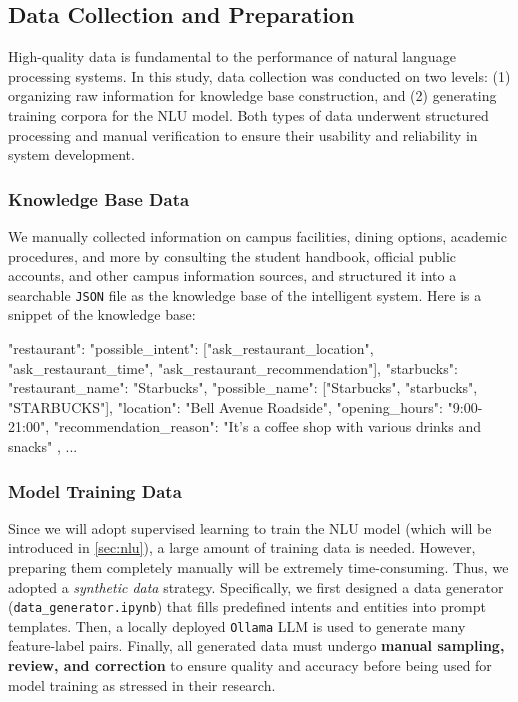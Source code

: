 \documentclass{xum_review}
\begin{document}
	\subsection{Data Collection and Preparation}

	High-quality data is fundamental to the performance of natural language
	processing systems. In this study, data collection was conducted on two
	levels: (1) organizing raw information for knowledge base construction, and
	(2) generating training corpora for the NLU model. Both types of data
	underwent structured processing and manual verification to ensure their
	usability and reliability in system development.

	\subsubsection{Knowledge Base Data}
	We manually collected information on campus facilities, dining options,
	academic procedures, and more by consulting the student handbook, official
	public accounts, and other campus information sources, and structured it
	into a searchable \texttt{JSON} file as the knowledge base of the intelligent
	system. Here is a snippet of the knowledge base:

	\begin{json}
"restaurant": {
	"possible_intent": ["ask_restaurant_location", "ask_restaurant_time", "ask_restaurant_recommendation"],
	"starbucks": {
		"restaurant_name": "Starbucks",
		"possible_name": ["Starbucks", "starbucks", "STARBUCKS"],
		"location": "Bell Avenue Roadside",
		"opening_hours": "9:00-21:00",
		"recommendation_reason": "It's a coffee shop with various drinks and snacks"
	},
	...
}
	\end{json}


	\subsubsection{Model Training Data}
	
	Since we will adopt supervised learning to train the NLU model (which will
	be introduced in \cref{sec:nlu}), a large amount of training data is needed.
	However, preparing them completely manually will be extremely
	time-consuming. Thus, we adopted a \textit{synthetic data} strategy.
	Specifically, we first designed a data generator
	(\texttt{data\_generator.ipynb}) that fills predefined intents and entities
	into prompt templates. Then, a locally deployed \texttt{Ollama} LLM is used
	to generate many feature-label pairs. Finally, all generated data must
	undergo \textbf{manual sampling, review, and correction} to ensure quality
	and accuracy before being used for model training as
	\citet{li2024datagenerationusinglarge} stressed in their research.
\end{document}
